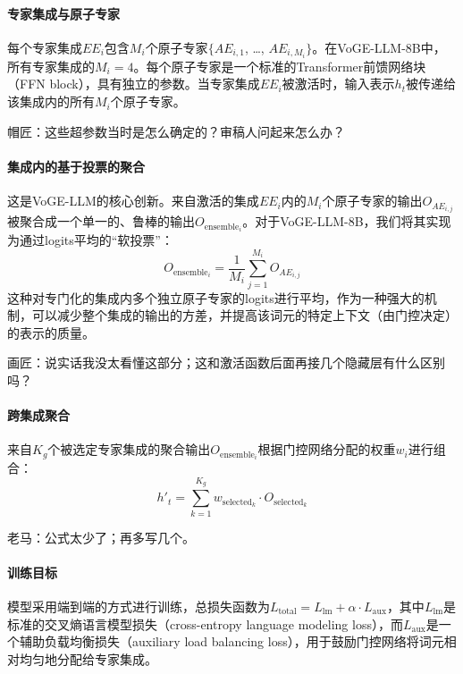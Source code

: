 \paragraph{专家集成与原子专家}
每个专家集成\(EE_i\)包含\(M_i\)个原子专家\(\{AE_{i,1}\), \ldots, \(AE_{i,M_i}\}\)。在VoGE-LLM-8B中，所有专家集成的\(M_i=4\)。每个原子专家是一个标准的Transformer前馈网络块（FFN block），具有独立的参数。当专家集成\(EE_i\)被激活时，输入表示\(h_t\)被传递给该集成内的所有\(M_i\)个原子专家。

{\kaiti 帽匠：这些超参数当时是怎么确定的？审稿人问起来怎么办？}

\paragraph{集成内的基于投票的聚合}
这是VoGE-LLM的核心创新。来自激活的集成\(EE_i\)内的\(M_i\)个原子专家的输出\(O_{AE_{i,j}}\)被聚合成一个单一的、鲁棒的输出\(O_{\text{ensemble}_i}\)。对于VoGE-LLM-8B，我们将其实现为通过logits平均的“软投票”：
\[O_{\text{ensemble}_i} = \frac{1}{M_i} \sum_{j=1}^{M_i} O_{AE_{i,j}}\]
这种对专门化的集成内多个独立原子专家的logits进行平均，作为一种强大的机制，可以减少整个集成的输出的方差，并提高该词元的特定上下文（由门控决定）的表示的质量。

{\kaiti 画匠：说实话我没太看懂这部分；这和激活函数后面再接几个隐藏层有什么区别吗？}

\paragraph{跨集成聚合}
来自\(K_g\)个被选定专家集成的聚合输出\(O_{\text{ensemble}_i}\)根据门控网络分配的权重\(w_i\)进行组合：
\[h'_t = \sum_{k=1}^{K_g} w_{\text{selected}_k} \cdot O_{\text{selected}_k}\]

{\kaiti 老马：公式太少了；再多写几个。}

\paragraph{训练目标} 模型采用端到端的方式进行训练，总损失函数为\(L_\text{total} = L_\text{lm} + \alpha \cdot L_\text{aux}\)，其中\(L_\text{lm}\)是标准的交叉熵语言模型损失（cross-entropy language modeling loss），而\(L_\text{aux}\)是一个辅助负载均衡损失（auxiliary load balancing loss），用于鼓励门控网络将词元相对均匀地分配给专家集成。

